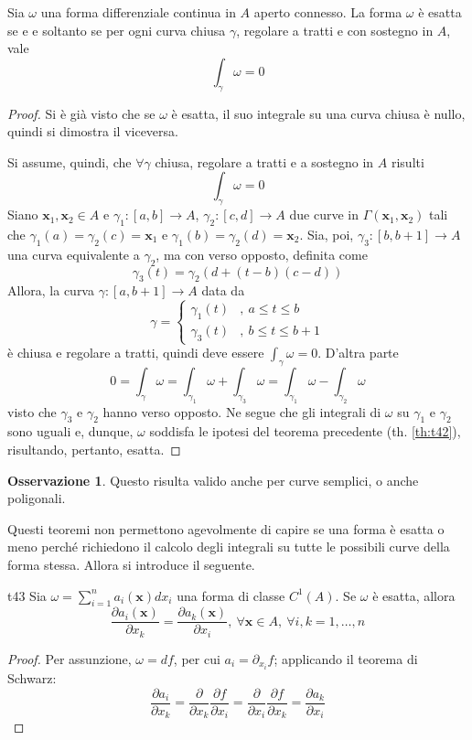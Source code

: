 \documentclass[10pt, a4paper]{scrartcl}
\theoremstyle{definition}
\numberwithin{esempio}{section}
\theoremstyle{definition}
\newtheorem{obs}{Osservazione}
\numberwithin{obs}{section}
\numberwithin{nota}{section}
\numberwithin{equation}{subsection}
\begin{document}
\begin{teorema}
	{}{}
	Sia $\omega$ una forma differenziale continua in $A$ aperto connesso.
	La forma $\omega$ \`e esatta se e e soltanto se per ogni curva chiusa $\gamma$, regolare a tratti e con sostegno in $A$, vale
	\[
	\int_{\gamma} \omega = 0 
	\] 
	\begin{proof}
		Si \`e gi\`a visto che se $\omega$ \`e esatta, il suo integrale su una curva chiusa \`e nullo, quindi si dimostra il viceversa.

		Si assume, quindi, che $ \forall \gamma$ chiusa, regolare a tratti e a sostegno in $A$ risulti
		\[
		\int_{\gamma} \omega = 0
		\] 
		Siano $\mathbf{x} _1, \mathbf{x} _2 \in A$ e $\gamma_1 :\left[ a,b \right] \to A$, $\gamma_2:\left[ c,d \right] \to A$ due curve in $\Gamma(\mathbf{x} _1,\mathbf{x} _2)$ tali che $\gamma_1(a) = \gamma_2(c)=\mathbf{x} _1$ e $\gamma_1(b) = \gamma_2(d) = \mathbf{x} _2$.
		Sia, poi, $\gamma_3:\left[ b,b+1 \right] \to A$ una curva equivalente a $\gamma_2$, ma con verso opposto, definita come
		\[
		\gamma_3(t) = \gamma_2(d+(t-b)(c-d))
		\] 
		Allora, la curva $\gamma:\left[ a,b+1 \right] \to A$ data da
		\[
		\gamma = \begin{cases}
			\gamma_1(t) &,\ a\le t\le b\\
			\gamma_3(t) &,\ b\le t\le b+1
		\end{cases}
		\] 
		\`e chiusa e regolare a tratti, quindi deve essere $\int_{\gamma} \omega = 0$. 
		D'altra parte
		\[
		0 = \int_{\gamma} \omega = \int_{\gamma_1} \omega + \int_{\gamma_3} \omega = \int_{\gamma_1} \omega - \int_{\gamma_2} \omega
		\] 
		visto che $\gamma_3$ e $\gamma_2$ hanno verso opposto.
		Ne segue che gli integrali di $\omega$ su $\gamma_1$ e $\gamma_2$ sono uguali e, dunque, $\omega$ soddisfa le ipotesi del teorema precedente (th. \ref{th:t42}), risultando, pertanto, esatta.
	\end{proof}
\end{teorema}
\begin{obs}
 Questo risulta valido anche per curve semplici, o anche poligonali.
\end{obs}
Questi teoremi non permettono agevolmente di capire se una forma \`e esatta o meno perch\'e richiedono il calcolo degli integrali su tutte le possibili curve della forma stessa.
Allora si introduce il seguente.
\begin{teorema}
	{}{t43}
	Sia $\omega = \sum_{i=1}^{n} a_i(\mathbf{x} ) dx_i$ una forma di classe $C^1(A)$. Se $\omega$ \`e esatta, allora 
	\[
	\frac{\partial a_i(\mathbf{x} )}{\partial x_k} = \frac{\partial a_k(\mathbf{x} )}{\partial x_i} , \ \forall \mathbf{x} \in A, \ \forall i,k=1,\ldots,n
	\] 
	\begin{proof}
		Per assunzione, $\omega = df$, per cui $a_i =  \partial _{x_i} f$; applicando il teorema di Schwarz:
		\[
		\frac{\partial a_i}{\partial x_k} = \frac{\partial }{\partial x_k} \frac{\partial f}{\partial x_i} = \frac{\partial }{\partial x_i} \frac{\partial f}{\partial x_k} = \frac{\partial a_k}{\partial x_i} 
		\] 
	\end{proof}
\end{teorema}
\end{document}
